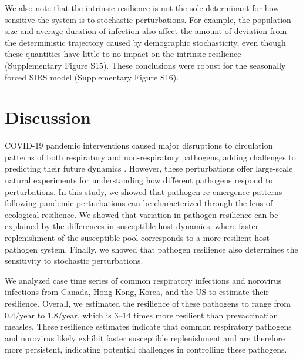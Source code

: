 \documentclass[12pt]{article}
\begin{document}
We also note that the intrinsic resilience is not the sole determinant for how sensitive the system is to stochastic perturbations.
For example, the population size and average duration of infection also affect the amount of deviation from the deterministic trajectory caused by demographic stochasticity, even though these quantities have little to no impact on the intrinsic resilience (Supplementary Figure S15).
These conclusions were robust for the seasonally forced SIRS model (Supplementary Figure S16).

\section*{Discussion}

COVID-19 pandemic interventions caused major disruptions to circulation patterns of both respiratory and non-respiratory pathogens, adding challenges to predicting their future dynamics \citep{baker2020impact,gomez2021uncertain,koltai2022determinants,park2024predicting}.
However, these perturbations offer large-scale natural experiments for understanding how different pathogens respond to perturbations.
In this study, we showed that pathogen re-emergence patterns following pandemic perturbations can be characterized through the lens of ecological resilience.
We showed that variation in pathogen resilience can be explained by the differences in susceptible host dynamics, where faster replenishment of the susceptible pool corresponds to a more resilient host-pathogen system.
Finally, we showed that pathogen resilience also determines the sensitivity to stochastic perturbations.

We analyzed case time series of common respiratory infections and norovirus infections from Canada, Hong Kong, Korea, and the US to estimate their resilience.
Overall, we estimated the resilience of these pathogens to range from $0.4/\mathrm{year}$ to $1.8/\mathrm{year}$, which is 3--14 times more resilient than prevaccination measles.
These resilience estimates indicate that common respiratory pathogens and norovirus likely exhibit faster susceptible replenishment and are therefore more persistent, indicating potential challenges in controlling these pathogens.
\end{document}
